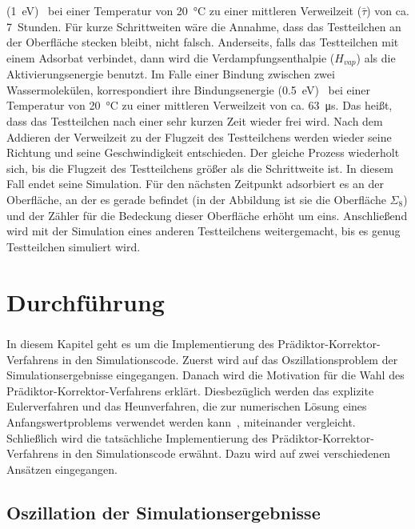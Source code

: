 \documentclass{listhesis}
\begin{document}
(\SI{1}{\electronvolt})~\cite{steelwater} bei einer Temperatur von \SI{20}{\celsius} zu einer mittleren Verweilzeit ($\bar{\tau}$) von ca. \SI{7}{Stunden}. Für kurze Schrittweiten wäre die Annahme, dass das Testteilchen an der Oberfläche stecken bleibt, nicht falsch. Anderseits, falls das Testteilchen mit einem Adsorbat verbindet, dann wird die Verdampfungsenthalpie ($H_{vap}$) als die Aktivierungsenergie benutzt. Im Falle einer Bindung zwischen zwei Wassermolekülen, korrespondiert ihre Bindungsenergie (\SI{0.5}{\electronvolt})~\cite{steelwater} bei einer Temperatur von \SI{20}{\celsius} zu einer mittleren Verweilzeit von ca. \SI{63}{\micro\s}. Das heißt, dass das Testteilchen nach einer sehr kurzen Zeit wieder frei wird. Nach dem Addieren der Verweilzeit zu der Flugzeit des Testteilchens werden wieder seine Richtung und seine Geschwindigkeit entschieden. Der gleiche Prozess wiederholt sich, bis die Flugzeit des Testteilchens größer als die Schrittweite ist. In diesem Fall endet seine Simulation. Für den nächsten Zeitpunkt adsorbiert es an der Oberfläche, an der es gerade befindet (in der Abbildung ist sie die Oberfläche $\Sigma_8$) und der Zähler für die Bedeckung dieser Oberfläche erhöht um eins. Anschließend wird mit der Simulation eines anderen Testteilchens weitergemacht, bis es genug Testteilchen simuliert wird. %

\chapter{Durchführung} \label{chap:durchfuehrung}
\paragraph{}
In diesem Kapitel geht es um die Implementierung des Prädiktor-Korrektor-Verfa\-hrens in den Simulationscode. Zuerst wird auf das Oszillationsproblem der Simulationsergebnisse eingegangen. Danach wird die Motivation für die Wahl des Prädiktor-Korrektor-Verfahrens erklärt. Diesbezüglich werden das explizite Eulerverfahren und das Heunverfahren, die zur numerischen Lösung eines Anfangswertproblems verwendet werden kann~\cite{ulbrich}, miteinander vergleicht. Schließlich wird die tatsächliche Implementierung des Prädiktor-Korrektor-Verfahrens in den Simulationscode erwähnt. Dazu wird auf zwei verschiedenen Ansätzen eingegangen.

\section{Oszillation der Simulationsergebnisse} \label{section:oscillation}
\end{document}
